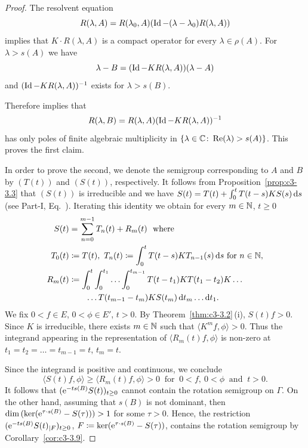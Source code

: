 \begin{proof}
The resolvent equation %
\[
	R(\lambda,A) = R(\lambda_{0},A)(\operatorname{Id} - (\lambda-\lambda_{0})R(\lambda,A))
\]
%
implies that $K \cdot R(\lambda,A)$ is a compact operator for every $\lambda \in \rho(A)$. 
For $\lambda > s(A)$ we have 
%
\[
	\lambda - B = (\operatorname{Id} - KR(\lambda,A))(\lambda-A)
\]
%
and $(\operatorname{Id} - KR(\lambda,A))^{-1}$ exists for $\lambda > s(B)$.

Therefore \textcite[Theorem XIII.13]{reedsimon:1979} 
implies that %
\[
	R(\lambda,B) = R(\lambda,A)(\operatorname{Id} - KR(\lambda,A))^{-1}
\]
%
has only poles of finite algebraic multiplicity in $\{\lambda \in \mathbb{C}  \colon \mathop{}\!\mathrm{Re}(\lambda) > s(A)\}$. 
This proves the first claim.

In order to prove the second, we denote the semigroup corresponding to $A$ and $B$ by $(T(t))$ and $(S(t))$,  respectively.
It follows from Proposition~\ref{prop:c3-3.3} that $(S(t))$ is irreducible and we have $S(t) = T(t) + \int_{0}^{t} T(t-s)KS(s)\mathop{}\!\mathrm{d}{s}$ (see Part-I, Eq.~). 
Iterating this identity we obtain for every $m \in \mathbb{N}$, $t \geq 0$
\begin{equation}\label{eq:c3-3.21}
\begin{split}
    S(t) &= \sum_{n=0}^{m-1} T_{n}(t) + R_{m}(t) \ \text{ where}\\ 
    T_{0}(t)&\coloneq T(t),\  T_{n}(t) \coloneq  \int_{0}^{t} T(t-s)KT_{n-1}(s)\mathop{}\!\mathrm{d}{s} \text{ for } n \in \mathbb{N} , \\
    R_{m}(t) &\coloneq \int_{0}^{t}\int_{0}^{t_{1}} \ldots \int_{0}^{t_{m-1}} T(t-t_{1})KT(t_{1}-t_{2})K \ldots \\
    &\qquad \ldots T(t_{m-1}-t_m)KS(t_{m})\mathop{}\!\mathrm{d}{t} _{m}\ldots \mathop{}\!\mathrm{d}{t} _{1} .
\end{split}
\end{equation}
We fix $0 < f \in E$, $0 < \phi \in E'$, $t > 0$. 
By Theorem~\ref{thm:c3-3.2}\,(i), $S(t)f > 0$.
Since $K$ is irreducible, there exists $m \in \mathbb{N}$ such that $\langle K^{m}f,\phi\rangle > 0$. 
Thus the integrand appearing in the representation  of\/ $\langle R_{m}(t)f,\phi\rangle$ is non-zero at $t_{1}=t_{2}= \ldots =t_{m-1}=t$, $t_{m}= t$.

Since the integrand is positive and continuous, we conclude
\begin{equation}\label{eq:c3-3.22}%
    \langle S(t)f,\phi\rangle \geq \langle R_{m}(t)f,\phi\rangle > 0 \ \text{ for } \ 0 < f  ,   \ 0 < \phi \ \text{ and } \ t > 0 .
\end{equation}
It follows that $(\eu^{-ts(B)}S(t))_{t \geq 0}$ cannot contain the rotation semigroup on $\Gamma$. 
On the other hand, assuming that $s(B)$ is not dominant, then $\mathop{}\!\mathrm{dim}\,(\ker(\mathrm{e}^{\tau\cdot s(B)} - S(\tau))) > 1$ for some $\tau > 0$. 
Hence, the restriction $(\eu^{-ts(B)}S(t)_{|F})_{t \geq 0}$, $F \coloneq  \ker(\mathrm{e}^{\tau\cdot s(B)}- S(\tau))$, contains the rotation semigroup by Corollary~\ref{cor:c3-3.9}.
\end{proof}
